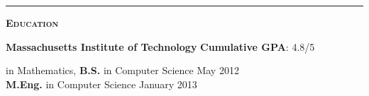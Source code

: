 \documentclass[11 pt]{article}
\begin{document}
\vspace{8pt}

\hrule

\begin{center}\begin{Large}\textsc{\textbf{Education}\\}\end{Large}
\end{center}

\noindent \textbf{Massachusetts Institute of Technology} \hfill \textbf{Cumulative GPA}: 4.8/5 \\
\begin{small}
 in Mathematics, {\bf B.S.} in Computer Science \hfill May 2012 \\
{\bf M.Eng.} in Computer Science \hfill January 2013 \\
\end{small}

\end{document}
